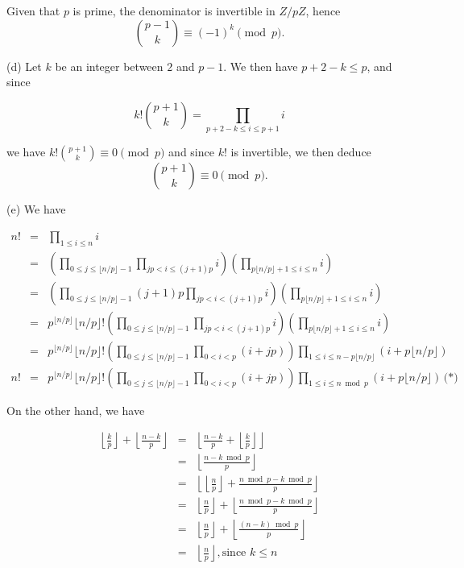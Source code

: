 \documentclass[a4paper,12pt]{article}
\newcommand{\subpar}[1]{\medskip \noindent (#1)}
\begin{document}
Given that $p$ is prime, the denominator is invertible in $Z/pZ$,
hence
\[ {{p-1} \choose k} \equiv (-1)^k \pmod p.\]

\subpar{d} Let $k$ be an integer between $2$ and $p-1$. We then have $p+2-k
\le p$, and since

\[  k!{{p+1} \choose k} = \prod_{p+2-k\le i\le p+1} i \]

we have $k! {{p+1} \choose k} \equiv 0 \pmod p$ and since $k!$ is invertible, we
then deduce
\[ {{p+1} \choose k} \equiv 0 \pmod p.\]

\subpar{e} We have

\begin{eqnarray*}
  n! &=& \prod_{1\le i\le n} i \\
  &=& \left( \prod_{0 \le j \le \lfloor n/p\rfloor - 1} \prod_{jp < i
    \le (j+1)p} i \right) \left( \prod_{p\lfloor n/p\rfloor + 1 \le i
    \le n} i\right) \\
  &=& \left( \prod_{0 \le j\le \lfloor n/p\rfloor - 1} (j+1)p
  \prod_{jp < i <(j+1)p} i \right)\left( \prod_{p\lfloor n/p\rfloor +
    1 \le i \le n} i\right) \\
  &=& p^{\lfloor n/p\rfloor} \lfloor n/p\rfloor!
  \left( \prod_{ 0 \le j \le \lfloor n/p\rfloor - 1} \prod_{jp < i <
    (j+1)p} i\right)\left( \prod_{p\lfloor n/p\rfloor + 1 \le i \le n}
  i\right) \\
  &=& p^{\lfloor n/p\rfloor} \lfloor n/p\rfloor! \left( \prod_{0\le j
    \le \lfloor n/p\rfloor - 1} \prod_{0 < i < p}(i+jp)\right)
  \prod_{1\le i\le n - p \lfloor n/p\rfloor} (i+p\lfloor n/p\rfloor) \\
  n!  &=& p^{\lfloor n/p\rfloor} \lfloor n/p\rfloor! \left( \prod_{0\le j
    \le \lfloor n/p\rfloor - 1} \prod_{0 < i < p}(i+jp)\right)
  \prod_{1\le i\le n \bmod p} (i+p\lfloor n/p\rfloor)\, \mbox{(*)}
\end{eqnarray*}

On the other hand, we have

\begin{eqnarray*}
  \left\lfloor \frac{k}{p}\right\rfloor + \left\lfloor
  \frac{n-k}{p}\right\rfloor &=& \left\lfloor \frac{n-k}{p} + \left\lfloor
  \frac{k}{p}\right\rfloor\right\rfloor \\
  &=& \left\lfloor \frac{n - k \bmod p}{p}\right\rfloor \\
  &=& \left\lfloor \left\lfloor \frac{n}{p}\right\rfloor + \frac{n
    \bmod p - k\bmod p}{p}\right\rfloor \\
  &=& \left\lfloor \frac{n}{p}\right\rfloor + \left\lfloor  \frac{n
    \bmod p - k\bmod p}{p}\right\rfloor \\
  &=& \left\lfloor \frac{n}{p}\right\rfloor + \left\lfloor
  \frac{(n-k)\bmod p}{p}\right\rfloor \\
  &=& \left\lfloor \frac{n}{p}\right\rfloor, \mbox{since $k \le n$}
\end{eqnarray*}
\end{document}
